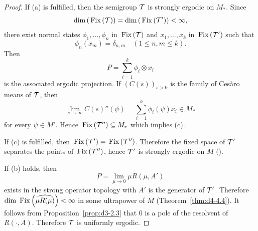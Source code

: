 \begin{proof}
If (a) is fulfilled, then the semigroup $ \mathcal{T} $  is strongly ergodic on $ M_{*} $.
Since
\[
\mathop{}\!\mathrm{dim}\, (\mathop{}\mathrm{Fix}\left(\mathcal{T}\right)) = \mathop{}\!\mathrm{dim}\, (\mathop{}\mathrm{Fix}\left(\mathcal{T}'\right)) < \infty,
\]
there exist normal states $ \phi_{1},\ldots,\phi_{n} $  in $ \mathop{}\mathrm{Fix}\left(\mathcal{T}\right) $  and $ x_{1},\ldots,x_{k} $  in $ \mathop{}\mathrm{Fix}\left(\mathcal{T}'\right) $  such that 
%
\[
	\phi_{n}(x_{m}) = \delta_{n,m} \quad (1 \leq n, m \leq k) .
\]
%
Then 
\[
P = \sum_{i=1}^{k} \phi_{i} \otimes x_{i} 
\]
is the associated ergodic projection.
If\/ $ (C(s))_{s>0} $  is the family of Cesàro means of\/ $ \mathcal{T} $, then
\[
\lim_{s \to \infty} C(s)''(\psi) = \sum_{i=1}^{k} \phi_{i}(\psi)x_{i} \in M_{*}
\]
for every $ \psi \in M' $.
Hence $ \mathop{}\mathrm{Fix}\left(\mathcal{T}''\right) \subseteq M_{*} $  which implies (c).

If (c) is fulfilled, then $ \mathop{}\mathrm{Fix}\left(\mathcal{T}'\right) = \mathop{}\mathrm{Fix}\left(\mathcal{T}''\right) $.
Therefore the fixed space of\/ $ \mathcal{T}' $  separates the points of\/ $ \mathop{}\mathrm{Fix}\left(\mathcal{T}''\right) $, hence $ \mathcal{T}' $  is strongly ergodic on $ M $  (\textcite[Chap.2, Theorem~1.4]{krengel:1985}).

If (b) holds, then
\[
P = \lim_{\mu \to 0} \mu R(\mu,A')
\]
exists in the strong operator topology with $ A' $  is the generator of\/ $ \mathcal{T}' $.
Therefore $ \mathop{}\!\mathrm{dim}\, \mathop{}\mathrm{Fix}\left(\widehat{\mu R(\mu)}\right) < \infty $  in some ultrapower of\/ $ M $  (Theorem~\ref{thm:d4-4.4}).
It follows from Proposition~\ref{prop:d3-2.3} that 0 is a pole of the resolvent of\/ $ R(\cdot,A) $.
Therefore $ \mathcal{T} $  is uniformly ergodic.
\end{proof}
